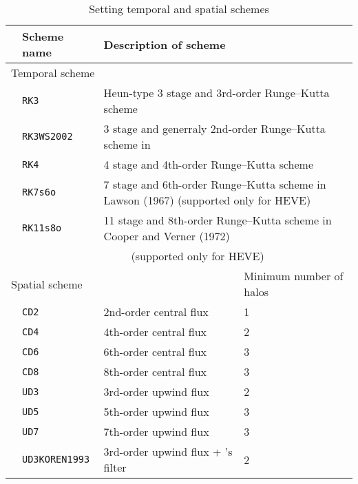 \begin{table}[bth]
\begin{center}
  \caption{Setting temporal and spatial schemes}
  \label{tab:nml_atm_dyn}
  \begin{tabularx}{150mm}{lllX} \hline
    \rowcolor[gray]{0.9} & \multicolumn{1}{l}{Scheme name} & \multicolumn{1}{l}{Description of scheme} & \\ \hline
    \multicolumn{3}{l}{Temporal scheme} &  \\ \hline
    & \multicolumn{1}{l}{\verb|RK3|}       & \multicolumn{2}{l}{Heun-type 3 stage and 3rd-order Runge--Kutta scheme} \\
    & \multicolumn{1}{l}{\verb|RK3WS2002|} & \multicolumn{2}{l}{3 stage and generraly 2nd-order Runge--Kutta scheme in \citet{Wicker_2002}} \\
    & \multicolumn{1}{l}{\verb|RK4|}       & \multicolumn{2}{l}{4 stage and 4th-order Runge--Kutta scheme} \\
    & \multicolumn{1}{l}{\verb|RK7s6o|}    & \multicolumn{2}{l}{7 stage and 6th-order Runge--Kutta scheme in Lawson (1967) (supported only for HEVE)} \\
    & \multicolumn{1}{l}{\verb|RK11s8o|}   & \multicolumn{2}{l}{11 stage and 8th-order Runge--Kutta scheme in Cooper and Verner (1972)} \\
    & \multicolumn{1}{l}{}                 & \multicolumn{2}{l}{~~~~~(supported only for HEVE)} \\
    \hline
    \multicolumn{3}{l}{Spatial scheme} & \multicolumn{1}{l}{Minimum number of halos}\\ \hline
    & \multicolumn{1}{l}{\verb|CD2|} & \multicolumn{1}{l}{2nd-order central flux} & \multicolumn{1}{l}{1}\\
    & \multicolumn{1}{l}{\verb|CD4|} & \multicolumn{1}{l}{4th-order central flux} & \multicolumn{1}{l}{2}\\
    & \multicolumn{1}{l}{\verb|CD6|} & \multicolumn{1}{l}{6th-order central flux} & \multicolumn{1}{l}{3}\\
    & \multicolumn{1}{l}{\verb|CD8|} & \multicolumn{1}{l}{8th-order central flux} & \multicolumn{1}{l}{3}\\
    & \multicolumn{1}{l}{\verb|UD3|} & \multicolumn{1}{l}{3rd-order upwind flux} & \multicolumn{1}{l}{2}\\
    & \multicolumn{1}{l}{\verb|UD5|} & \multicolumn{1}{l}{5th-order upwind flux} & \multicolumn{1}{l}{3}\\
    & \multicolumn{1}{l}{\verb|UD7|} & \multicolumn{1}{l}{7th-order upwind flux} & \multicolumn{1}{l}{3}\\
    & \multicolumn{1}{l}{\verb|UD3KOREN1993|} & \multicolumn{1}{l}{3rd-order upwind flux + \citet{Koren_1993}'s filter} & \multicolumn{1}{l}{2}\\
\hline
  \end{tabularx}
\end{center}
\end{table}


